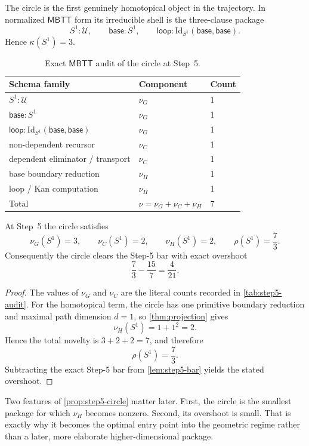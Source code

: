 \documentclass{lmcs}
\newcommand{\U}{\mathcal{U}}
\newcommand{\Id}{\mathrm{Id}}
\newcommand{\MBTT}{\mathsf{MBTT}}
\newcommand{\base}{\mathsf{base}}
\newcommand{\loopc}{\mathsf{loop}}
\begin{document}
The circle is the first genuinely homotopical object in the trajectory. In normalized $\MBTT$ form its irreducible shell is the three-clause package
\[
  S^1 : \U,
  \qquad
  \base : S^1,
  \qquad
  \loopc : \Id_{S^1}(\base,\base).
\]
Hence $\kappa(S^1)=3$.

\begin{table}[tbp]
\centering
\caption{Exact $\MBTT$ audit of the circle at Step~5.}
\label{tab:step5-audit}
\small
\begin{tabular}{@{}lll@{}}
\toprule
Schema family & Component & Count \\
\midrule
$S^1 : \U$ & $\nu_G$ & 1 \\
$\base : S^1$ & $\nu_G$ & 1 \\
$\loopc : \Id_{S^1}(\base,\base)$ & $\nu_G$ & 1 \\
non-dependent recursor & $\nu_C$ & 1 \\
dependent eliminator / transport & $\nu_C$ & 1 \\
base boundary reduction & $\nu_H$ & 1 \\
loop / Kan computation & $\nu_H$ & 1 \\
\midrule
Total & $\nu = \nu_G+\nu_C+\nu_H$ & 7 \\
\bottomrule
\end{tabular}
\end{table}

\begin{prop}
\label{prop:step5-circle}
At Step~5 the circle satisfies
\[
  \nu_G(S^1)=3,
  \qquad
  \nu_C(S^1)=2,
  \qquad
  \nu_H(S^1)=2,
  \qquad
  \rho(S^1)=\frac{7}{3}.
\]
Consequently the circle clears the Step-5 bar with exact overshoot
\[
  \frac{7}{3} - \frac{15}{7} = \frac{4}{21}.
\]
\end{prop}

\begin{proof}
The values of $\nu_G$ and $\nu_C$ are the literal counts recorded in \autoref{tab:step5-audit}. For the homotopical term, the circle has one primitive boundary reduction and maximal path dimension $d=1$, so \autoref{thm:projection} gives
\[
  \nu_H(S^1) = 1 + 1^2 = 2.
\]
Hence the total novelty is $3+2+2=7$, and therefore
\[
  \rho(S^1)=\frac{7}{3}.
\]
Subtracting the exact Step-5 bar from \autoref{lem:step5-bar} yields the stated overshoot.
\end{proof}

Two features of \autoref{prop:step5-circle} matter later. First, the circle is the smallest package for which $\nu_H$ becomes nonzero. Second, its overshoot is small. That is exactly why it becomes the optimal entry point into the geometric regime rather than a later, more elaborate higher-dimensional package.
\end{document}
